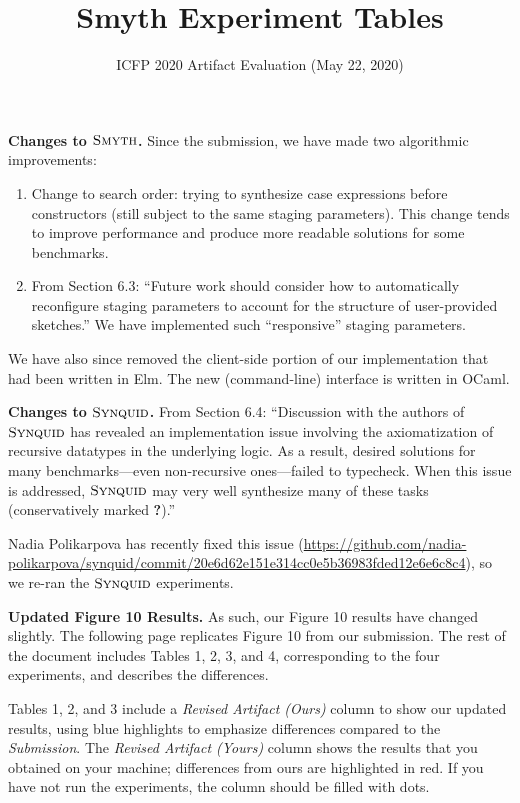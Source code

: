 \documentclass[acmsmall,nonacm]{acmart}
\newcommand{\snsMyth}
  {\ensuremath{\textsc{Smyth}}}
\newcommand{\synquid}
  {\ensuremath{\textsc{Synquid}}}
\begin{document}
\title{Smyth Experiment Tables}
\subtitle{ICFP 2020 Artifact Evaluation (May 22, 2020)}
\maketitle

\textbf{Changes to \snsMyth{}.}
%
Since the submission, we have made two algorithmic improvements:

\begin{enumerate}

\item Change to search order: trying to synthesize case expressions before
constructors (still subject to the same staging parameters). This change tends
to improve performance and produce more readable solutions for some benchmarks.

\item From Section 6.3: ``Future work should consider how to automatically
reconfigure staging parameters to account for the structure of user-provided
sketches.'' We have implemented such ``responsive'' staging parameters.

\end{enumerate}

We have also since removed the client-side portion of our implementation that
had been written in Elm. The new (command-line) interface is written in OCaml.

\vspace{0.50in}
\noindent
\textbf{Changes to \synquid{}.}
%
From Section 6.4: ``Discussion with the authors of \synquid{} has revealed an
implementation issue involving the axiomatization of recursive
datatypes in the underlying logic.
%
As a result, desired solutions for many benchmarks---even non-recursive
ones---failed to typecheck.
%
When this issue is addressed, \synquid{} may very well synthesize many
of these tasks (conservatively marked \textbf{?}).''

Nadia Polikarpova has recently fixed this issue
%
(\url{https://github.com/nadia-polikarpova/synquid/commit/20e6d62e151e314cc0e5b36983fded12e6e6c8c4}),
%
so we re-ran the \synquid{} experiments.


\vspace{0.50in}
\noindent
\textbf{Updated Figure 10 Results.}
%
As such, our Figure 10 results have changed slightly.
%
The following page replicates Figure 10 from our submission.
%
The rest of the document includes Tables 1, 2, 3, and 4, corresponding to the four
experiments, and describes the differences.

Tables 1, 2, and 3 include a \textit{Revised Artifact (Ours)} column to show our
updated results, using blue highlights to emphasize differences compared to the
\textit{Submission}.
%
The \textit{Revised Artifact (Yours)} column shows the results that you obtained
on your machine; differences from ours are highlighted in red.
%
If you have not run the experiments, the column should be filled with dots.



\clearpage

\setcounter{figure}{9}

\setcounter{figure}{0}





\end{document}
